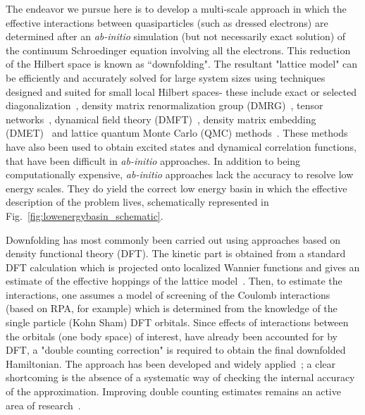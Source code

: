 The endeavor we pursue here is to develop a multi-scale approach in which the effective interactions between 
quasiparticles (such as dressed electrons) are determined after an \emph{ab-initio} simulation (but not necessarily exact 
solution) of the continuum Schroedinger equation involving all the electrons. This reduction 
of the Hilbert space is known as ``downfolding". The resultant "lattice model" can be efficiently and accurately 
solved for large system sizes using techniques designed and suited for small local Hilbert spaces- these include 
exact or selected diagonalization~\cite{DeRaedt,Holmes_Tubman_Umrigar}, density matrix renormalization group 
(DMRG)~\cite{White1992}, tensor networks~\cite{PEPS,Changlani_CPS,NeuscammanCPS}, 
dynamical field theory (DMFT)~\cite{}, density matrix embedding (DMET)~\cite{DMET_2012} and 
lattice quantum Monte Carlo (QMC) methods~\cite{Scalapino, Trivedi_Ceperley, Zhang_AFQMC, Sandvik_loops, Prokofiev, 
Booth2009,SQMC,Holmes_Changlani_Umrigar, Booth2013}. These methods have also been used to obtain 
excited states and dynamical correlation functions, that have been difficult in \emph{ab-initio} approaches. 
In addition to being computationally expensive, \emph{ab-initio} approaches lack the accuracy to resolve 
low energy scales. They do yield the correct low energy basin in which the effective description of the problem lives, 
schematically represented in Fig.~\ref{fig:lowenergybasin_schematic}.

Downfolding has most commonly been carried out using approaches based on density functional theory (DFT). 
The kinetic part is obtained from a standard 
DFT calculation which is projected onto localized Wannier functions and 
gives an estimate of the effective hoppings of the lattice model~\cite{Pavirini}. 
Then, to estimate the interactions, one assumes a model of screening of the Coulomb interactions 
(based on RPA, for example) which is determined from the knowledge of the single particle (Kohn Sham) 
DFT orbitals. Since effects of interactions between the orbitals (one body space) of interest, have already 
been accounted for by DFT, a "double counting correction" is required to obtain the final 
downfolded Hamiltonian. The approach has been developed and widely applied~\cite{}; 
a clear shortcoming is the absence of a systematic way of checking 
the internal accuracy of the approximation. Improving double counting estimates remains an active area of 
research~\cite{Haule_doublecounting}.

